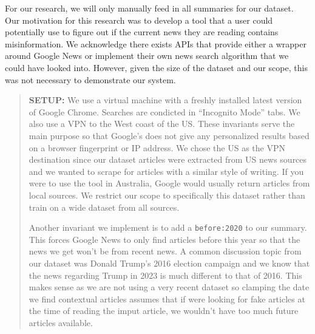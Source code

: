 \documentclass{article}
\begin{document}
For our research, we will only manually feed in all summaries for our dataset. Our motivation for this research was to develop a tool that a user could potentially use to figure out if the current news they are reading contains misinformation. We acknowledge there exists APIs that provide either a wrapper around Google News or implement their own news search algorithm that we could have looked into. However, given the size of the dataset and our scope, this was not necessary to demonstrate our system.

\begin{quote}
  \textbf{SETUP:} We use a virtual machine with a freshly installed latest version of Google Chrome. Searches are condicted in ``Incognito Mode'' tabs. We also use a VPN to the West coast of the US. These invariants serve the main purpose so that Google's does not give any personalized results based on a browser fingerprint or IP address. We chose the US as the VPN destination since our dataset articles were extracted from US news sources and we wanted to scrape for articles with a similar style of writing. If you were to use the tool in Australia, Google would usually return articles from local sources. We restrict our scope to specifically this dataset rather than train on a wide dataset from all sources.

  Another invariant we implement is to add a \verb|before:2020| to our summary. This forces Google News to only find articles before this year so that the news we get won't be from recent news. A common discussion topic from our dataset was Donald Trump's 2016 election campaign and we know that the news regarding Trump in 2023 is much different to that of 2016. This makes sense as we are not using a very recent dataset so clamping the date we find contextual articles assumes that if were looking for fake articles at the time of reading the imput article, we wouldn't have too much future articles available.


\end{quote}
\end{document}

